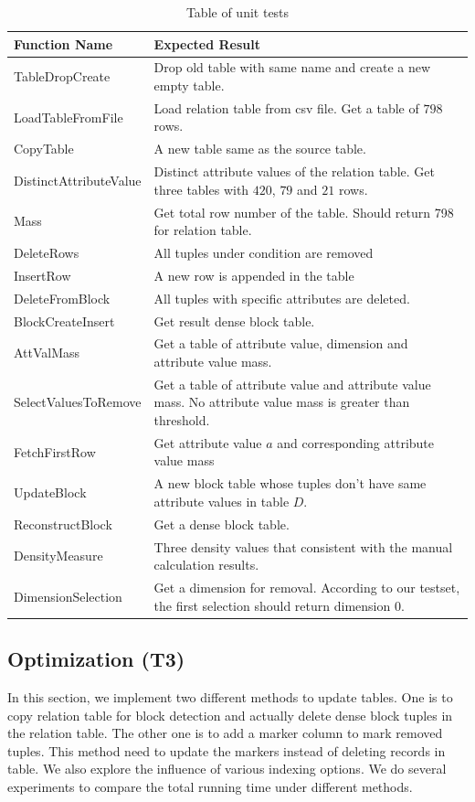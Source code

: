 \begin{table}[h!]
\centering
\begin{tabular}{|p{5cm}|p{10cm}|}
 \hline
 Function Name & Expected Result \\ [0.5ex] 
 \hline\hline
 TableDropCreate & Drop old table with same name and create a new empty table. \\ 
 LoadTableFromFile & Load relation table from csv file. Get a table of $798$ rows. \\
 CopyTable & A new table same as the source table.\\
 DistinctAttributeValue & Distinct attribute values of the relation table. Get three tables with $420$, $79$ and $21$ rows. \\
 Mass & Get total row number of the table. Should return 798 for relation table. \\
 DeleteRows & All tuples under condition are removed \\
 InsertRow & A new row is appended in the table \\
 DeleteFromBlock & All tuples with specific attributes are deleted. \\
 BlockCreateInsert & Get result dense block table. \\
 AttValMass & Get a table of attribute value, dimension and attribute value mass. \\
 SelectValuesToRemove & Get a table of attribute value and attribute value mass. No attribute value mass is greater than threshold. \\
 FetchFirstRow & Get attribute value $a$ and corresponding attribute value mass \\ 
 UpdateBlock & A new block table whose tuples don't have same attribute values in table $D$. \\
 ReconstructBlock & Get a dense block table.\\
 DensityMeasure & Three density values that consistent with the manual calculation results. \\
 DimensionSelection & Get a dimension for removal. According to our testset, the first selection should return dimension $0$.\\ [1ex] 
 \hline
\end{tabular}
\caption{Table of unit tests}
\label{table:test}
\end{table}

\subsection{Optimization (T3)}
In this section, we implement two different methods to update tables. One is to copy relation table for block detection and actually delete dense block tuples in the relation table. The other one is to add a marker column to mark removed tuples. This method need to update the markers instead of deleting records in table. We also explore the influence of various indexing options. We do several experiments to compare the total running time under different methods.

